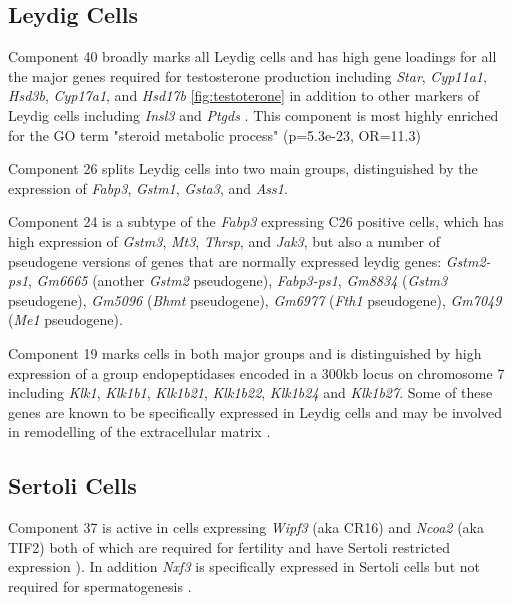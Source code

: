 \subsection{Leydig Cells}
Component 40 broadly marks all Leydig cells and has high gene loadings for all the major genes required for testosterone production including \textit{Star}, \textit{Cyp11a1}, \textit{Hsd3b}, \textit{Cyp17a1}, and \textit{Hsd17b} \ref{fig:testoterone} \cite{Stojkov2013Orally} in addition to other markers of Leydig cells including \textit{Insl3} and \textit{Ptgds} \parencite{Balvers1998RelaxinLike, Baker2001Expression}. This component is most highly enriched for the GO term "steroid metabolic process" (p=5.3e-23, OR=11.3)

Component 26 splits Leydig cells into two main groups, distinguished by the expression of \textit{Fabp3}, \textit{Gstm1}, \textit{Gsta3}, and \textit{Ass1}.

Component 24 is a subtype of the \textit{Fabp3} expressing C26 positive cells, which has high expression of \textit{Gstm3}, \textit{Mt3}, \textit{Thrsp}, and \textit{Jak3}, but also a number of pseudogene versions of genes that are normally expressed leydig genes: \textit{Gstm2-ps1}, \textit{Gm6665} (another \textit{Gstm2} pseudogene), \textit{Fabp3-ps1}, \textit{Gm8834} (\textit{Gstm3} pseudogene), \textit{Gm5096} (\textit{Bhmt} pseudogene), \textit{Gm6977} (\textit{Fth1} pseudogene), \textit{Gm7049} (\textit{Me1} pseudogene).

Component 19 marks cells in both major groups and is distinguished by high expression of a group endopeptidases encoded in a 300kb locus on chromosome 7 including \textit{Klk1}, \textit{Klk1b1}, \textit{Klk1b21}, \textit{Klk1b22}, \textit{Klk1b24} and \textit{Klk1b27}. Some of these genes are known to be specifically expressed in Leydig cells and may be involved in remodelling of the extracellular matrix \parencite{Sanz2013RiboTag, Matsui2000Cloning, Matsui2001Mouse, Matsui2005Characterization}.

\subsection{Sertoli Cells}

Component 37 is active in cells expressing \textit{Wipf3} (aka CR16) and \textit{Ncoa2} (aka TIF2) both of which are required for fertility and have Sertoli restricted expression \cite{Suetsugu2007Malespecific, Gehin2002Function}). In addition \textit{Nxf3} is specifically expressed in Sertoli cells but not required for spermatogenesis \cite{Zhou2011Nxf3}.

